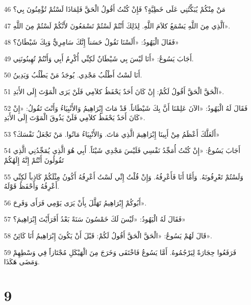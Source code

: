 \par 46 مَنْ مِنْكُمْ يُبَكِّتُنِي عَلَى خَطِيَّةٍ؟ فَإِنْ كُنْتُ أَقُولُ الْحَقَّ فَلِمَاذَا لَسْتُمْ تُؤْمِنُونَ بِي؟
\par 47 اَلَّذِي مِنَ اللَّهِ يَسْمَعُ كلاَمَ اللَّهِ. لِذَلِكَ أَنْتُمْ لَسْتُمْ تَسْمَعُونَ لأَنَّكُمْ لَسْتُمْ مِنَ اللَّهِ».
\par 48 فَقَالَ الْيَهُودُ: «أَلَسْنَا نَقُولُ حَسَناً إِنَّكَ سَامِرِيٌّ وَبِكَ شَيْطَانٌ؟»
\par 49 أَجَابَ يَسُوعُ: «أَنَا لَيْسَ بِي شَيْطَانٌ لَكِنِّي أُكْرِمُ أَبِي وَأَنْتُمْ تُهِينُونَنِي.
\par 50 أَنَا لَسْتُ أَطْلُبُ مَجْدِي. يُوجَدُ مَنْ يَطْلُبُ وَيَدِينُ.
\par 51 اَلْحَقَّ الْحَقَّ أَقُولُ لَكُمْ: إِنْ كَانَ أَحَدٌ يَحْفَظُ كلاَمِي فَلَنْ يَرَى الْمَوْتَ إِلَى الأَبَدِ».
\par 52 فَقَالَ لَهُ الْيَهُودُ: «الآنَ عَلِمْنَا أَنَّ بِكَ شَيْطَاناً. قَدْ مَاتَ إِبْرَاهِيمُ وَالأَنْبِيَاءُ وَأَنْتَ تَقُولُ: «إِنْ كَانَ أَحَدٌ يَحْفَظُ كلاَمِي فَلَنْ يَذُوقَ الْمَوْتَ إِلَى الأَبَدِ».
\par 53 أَلَعَلَّكَ أَعْظَمُ مِنْ أَبِينَا إِبْرَاهِيمَ الَّذِي مَاتَ. وَالأَنْبِيَاءُ مَاتُوا. مَنْ تَجْعَلُ نَفْسَكَ؟»
\par 54 أَجَابَ يَسُوعُ: «إِنْ كُنْتُ أُمَجِّدُ نَفْسِي فَلَيْسَ مَجْدِي شَيْئاً. أَبِي هُوَ الَّذِي يُمَجِّدُنِي الَّذِي تَقُولُونَ أَنْتُمْ إِنَّهُ إِلَهُكُمْ
\par 55 وَلَسْتُمْ تَعْرِفُونَهُ. وَأَمَّا أَنَا فَأَعْرِفُهُ. وَإِنْ قُلْتُ إِنِّي لَسْتُ أَعْرِفُهُ أَكُونُ مِثْلَكُمْ كَاذِباً لَكِنِّي أَعْرِفُهُ وَأَحْفَظُ قَوْلَهُ.
\par 56 أَبُوكُمْ إِبْرَاهِيمُ تَهَلَّلَ بِأَنْ يَرَى يَوْمِي فَرَأَى وَفَرِحَ».
\par 57 فَقَالَ لَهُ الْيَهُودُ: «لَيْسَ لَكَ خَمْسُونَ سَنَةً بَعْدُ أَفَرَأَيْتَ إِبْرَاهِيمَ؟»
\par 58 قَالَ لَهُمْ يَسُوعُ: «الْحَقَّ الْحَقَّ أَقُولُ لَكُمْ: قَبْلَ أَنْ يَكُونَ إِبْرَاهِيمُ أَنَا كَائِنٌ».
\par 59 فَرَفَعُوا حِجَارَةً لِيَرْجُمُوهُ. أَمَّا يَسُوعُ فَاخْتَفَى وَخَرَجَ مِنَ الْهَيْكَلِ مُجْتَازاً فِي وَسْطِهِمْ وَمَضَى هَكَذَا.

\chapter{9}

